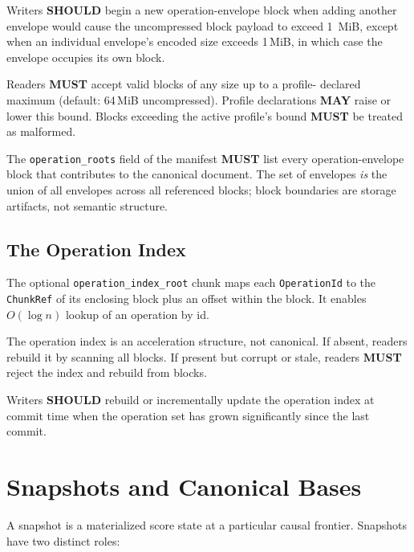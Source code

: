 \documentclass[11pt,letterpaper]{report}
\newcounter{requirement}[chapter]
\newcommand{\MUST}{\textbf{MUST}}
\newcommand{\SHOULD}{\textbf{SHOULD}}
\newcommand{\MAY}{\textbf{MAY}}
\begin{document}
\begin{requirement}
  \label{req:format:operation-block-bounds}
  Writers \SHOULD{} begin a new operation-envelope block when
  adding another envelope would cause the uncompressed block
  payload to exceed 1 \,MiB, except when an individual envelope's
  encoded size exceeds 1\,MiB, in which case the envelope occupies
  its own block.

  Readers \MUST{} accept valid blocks of any size up to a profile-
  declared maximum (default: 64\,MiB uncompressed). Profile
  declarations \MAY{} raise or lower this bound. Blocks exceeding
  the active profile's bound \MUST{} be treated as malformed.

  The \texttt{operation\_roots} field of the manifest \MUST{} list
  every operation-envelope block that contributes to the canonical
  document. The set of envelopes \emph{is} the union of all
  envelopes across all referenced blocks; block boundaries are
  storage artifacts, not semantic structure.
\end{requirement}

\subsection{The Operation Index}

The optional \texttt{operation\_index\_root} chunk maps each
\texttt{OperationId} to the \texttt{ChunkRef} of its enclosing
block plus an offset within the block. It enables $O(\log n)$
lookup of an operation by id.

\begin{requirement}
  \label{req:format:rebuildable-operation-index}
  The operation index is an acceleration structure, not canonical.
  If absent, readers rebuild it by scanning all blocks. If present
  but corrupt or stale, readers \MUST{} reject the index and
  rebuild from blocks.

  Writers \SHOULD{} rebuild or incrementally update the operation
  index at commit time when the operation set has grown
  significantly since the last commit.
\end{requirement}

\section{Snapshots and Canonical Bases}
\label{sec:format:snapshots}

A snapshot is a materialized score state at a particular causal
frontier. Snapshots have two distinct roles:
\end{document}
